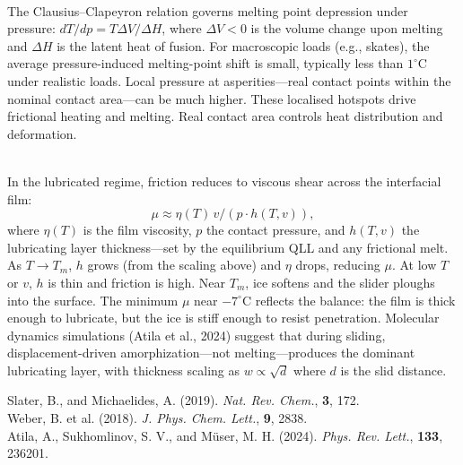 \begin{technical}
\\[0.5em]
The Clausius–Clapeyron relation governs melting point depression under pressure: $dT/dp = T \Delta V/\Delta H$, where $\Delta V < 0$ is the volume change upon melting and $\Delta H$ is the latent heat of fusion. For macroscopic loads (e.g., skates), the average pressure-induced melting-point shift is small, typically less than $1^\circ\text{C}$ under realistic loads. Local pressure at asperities—real contact points within the nominal contact area—can be much higher. These localised hotspots drive frictional heating and melting. Real contact area controls heat distribution and deformation.

\\[0.5em]
In the lubricated regime, friction reduces to viscous shear across the interfacial film:
\[
\mu \approx \eta(T)\, v / (p \cdot h(T,v)),
\]
where $\eta(T)$ is the film viscosity, $p$ the contact pressure, and $h(T,v)$ the lubricating layer thickness—set by the equilibrium QLL and any frictional melt. As $T \to T_m$, $h$ grows (from the scaling above) and $\eta$ drops, reducing $\mu$. At low $T$ or $v$, $h$ is thin and friction is high. Near $T_m$, ice softens and the slider ploughs into the surface. The minimum $\mu$ near $-7^\circ$C reflects the balance: the film is thick enough to lubricate, but the ice is stiff enough to resist penetration. Molecular dynamics simulations (Atila et al., 2024) suggest that during sliding, displacement-driven amorphization—not melting—produces the dominant lubricating layer, with thickness scaling as $w \propto \sqrt{d}$ where $d$ is the slid distance.

\techref
{\footnotesize
Slater, B., and Michaelides, A. (2019). \textit{Nat. Rev. Chem.}, \textbf{3}, 172.\\
Weber, B. et al. (2018). \textit{J. Phys. Chem. Lett.}, \textbf{9}, 2838.\\
Atila, A., Sukhomlinov, S. V., and M\"{u}ser, M. H. (2024). \textit{Phys. Rev. Lett.}, \textbf{133}, 236201.
}

\end{technical}
